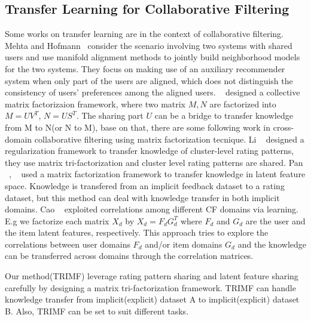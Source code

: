\subsection{Transfer Learning for Collaborative Filtering}
Some works on transfer learning are in the context of collaborative filtering.
Mehta and Hofmann~\cite{/ki/bhaskar06cross} consider the scenario involving two systems with shared users and use manifold alignment methods to jointly build neighborhood models for the two systems. They focus on making use of an auxiliary recommender system when only part of the users are aligned, which does not distinguish the consistency of users' preferences among the aligned users.
~\cite{/kdd/SinghG08} designed a collective matrix factorizaion framework, where two matrix $M, N$ are factorized into $M = UV^T$, $N = US^T$. The sharing part $U$ can be a bridge to transfer knowledge from M to N(or N to M), base on that, there are some following work in cross-domain collaborative filtering using matrix factorization tecnique.
Li \etal~\cite{/icml/libin09} designed a regularization framework to transfer knowledge of cluster-level rating patterns, they use matrix tri-factorization and cluster level rating patterns are shared.
Pan \etal~\cite{/ijcai/PanLXY11}, ~\cite{AAAI101649} used a matrix factorization framework to transfer knowledge in latent feature space. Knowledge is transfered from an implicit feedback dataset to a rating dataset, but this method can deal with knowledge transfer in both implicit domains.
Cao \etal~\cite{cao2010transfer} exploited correlations among different CF domains via learning. E.g we factorize each matrix $X_d$ by $X_d = F_d G_d^T$ where $F_d$ and $G_d$ are the user and the item latent features, respectively. This approach tries to explore the correlations between user domains {$F_d$} and/or item domains {$G_d$} and the knowledge can be
transferred across domains through the correlation matrices.

Our method(TRIMF) leverage rating pattern sharing and latent feature sharing carefully by designing a matrix tri-factorization framework. TRIMF can handle knowledge transfer from implicit(explicit) dataset A to implicit(explicit) dataset B. Also, TRIMF can be set to suit different tasks.

\hspace{0.05in}

